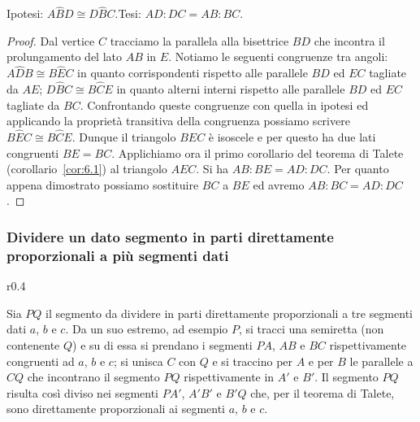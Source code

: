\noindent\begin{minipage}{0.65\textwidth}\parindent15pt
\noindent Ipotesi: $A\widehat{B}D\cong D\widehat{B}C$.\tab\tab Tesi: $AD : DC = AB : BC$.

\begin{proof}
Dal vertice $C$ tracciamo la parallela alla bisettrice $BD$ che incontra il prolungamento del lato $AB$ in $E$. Notiamo le seguenti congruenze tra angoli: $A\widehat{D}B\cong B\widehat{E}C$ in quanto corrispondenti rispetto alle parallele $BD$ ed $EC$ tagliate da $AE$; $D\widehat{B}C\cong B\widehat{C}E$ in quanto alterni interni rispetto alle parallele $BD$ ed $EC$ tagliate da $BC$.
Confrontando queste congruenze con quella in ipotesi ed applicando la proprietà transitiva della congruenza possiamo scrivere $B\widehat{E}C\cong B\widehat{C}E$. Dunque il triangolo $BEC$ è isoscele e per questo ha due lati congruenti $BE = BC$.
Applichiamo ora il primo corollario del teorema di Talete (corollario~\ref{cor:6.1}) al triangolo $AEC$. Si ha $AB : BE = AD : DC$. 
Per quanto appena dimostrato possiamo sostituire $BC$ a $BE$ ed avremo $AB : BC = AD : DC$.
\end{proof}
\end{minipage}\hfil
\begin{minipage}{0.35\textwidth}
	\centering
\end{minipage}\vspace{5pt}

\subsubsection{Dividere un dato segmento in parti direttamente proporzionali a più segmenti dati}

\begin{wrapfigure}{r}{0.4\textwidth}
	\centering
\end{wrapfigure}
Sia $PQ$ il segmento da dividere in parti direttamente proporzionali a tre segmenti dati $a$, $b$ e $c$.
Da un suo estremo, ad esempio $P$, si tracci una semiretta (non contenente $Q$) e su di essa si prendano i segmenti $PA$, $AB$ e $BC$ rispettivamente congruenti ad $a$, $b$ e $c$; si unisca $C$ con $Q$ e si traccino per $A$ e per $B$ le parallele a $CQ$ che incontrano il segmento $PQ$ rispettivamente in $A'$ e $B'$. Il segmento $PQ$ risulta così diviso nei segmenti $PA'$, $A'B'$ e $B'Q$ che, per il teorema di Talete, sono direttamente proporzionali ai segmenti $a$, $b$ e $c$.

